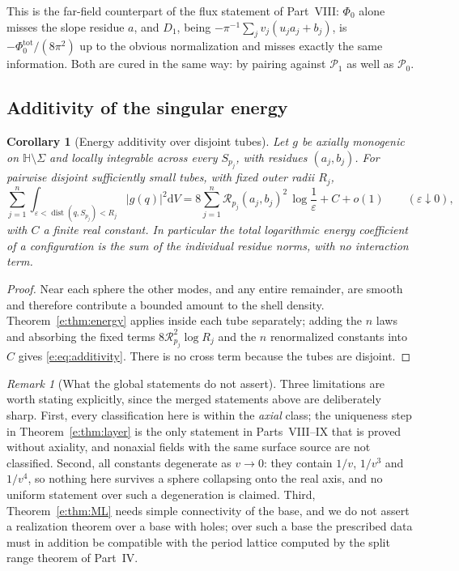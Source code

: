 \documentclass[11pt,a4paper]{article}
\numberwithin{equation}{section}
\newtheorem{corollary}[theorem]{Corollary}
\theoremstyle{definition}
\theoremstyle{remark}
\newtheorem{remark}[theorem]{Remark}
\theoremstyle{plain}
\newcommand{\HH}{\mathbb H}
\newcommand{\abs}[1]{\lvert #1\rvert}
\newcommand{\dd}{\mathrm d}
\begin{document}
This is the far-field counterpart of the flux statement of Part~VIII:
$\Phi_0$ alone misses the slope residue $a$, and $D_1$, being
$-\pi^{-1}\sum_jv_j(u_ja_j+b_j)$, is $-\Phi_0^{\mathrm{tot}}/(8\pi^2)$ up
to the obvious normalization and misses exactly the same information.
Both are cured in the same way: by pairing against $\mathcal P_1$ as well
as $\mathcal P_0$.

\subsection{Additivity of the singular energy}
\label{e:sec:additivity}

\begin{corollary}[Energy additivity over disjoint tubes]
\label{e:cor:additivity}
Let $g$ be axially monogenic on $\HH\setminus\Sigma$ and locally
integrable across every $S_{p_j}$, with residues $(a_j,b_j)$. For
pairwise disjoint sufficiently small tubes, with fixed outer radii
$R_j$,
\begin{equation}
 \sum_{j=1}^{n}\int_{\varepsilon<\operatorname{dist}(q,S_{p_j})<R_j}
        \abs{g(q)}^2\dd V
 =8\sum_{j=1}^{n}\mathcal R_{p_j}(a_j,b_j)^2\,\log\frac1\varepsilon
   +C+o(1)
 \qquad(\varepsilon\downarrow0),
 \label{e:eq:additivity}
\end{equation}
with $C$ a finite real constant. In particular the total logarithmic
energy coefficient of a configuration is the sum of the individual
residue norms, with no interaction term.
\end{corollary}

\begin{proof}
Near each sphere the other modes, and any entire remainder, are smooth
and therefore contribute a bounded amount to the shell density.
Theorem~\ref{e:thm:energy} applies inside each tube separately; adding
the $n$ laws and absorbing the fixed terms $8\mathcal
R_{p_j}^2\log R_j$ and the $n$ renormalized constants into $C$ gives
\eqref{e:eq:additivity}. There is no cross term because the tubes are
disjoint.
\end{proof}

\begin{remark}[What the global statements do not assert]
\label{e:rem:globalnotasserted}
Three limitations are worth stating explicitly, since the merged
statements above are deliberately sharp. First, every classification here
is within the \emph{axial} class; the uniqueness step in
Theorem~\ref{e:thm:layer} is the only statement in Parts~VIII--IX that is
proved without axiality, and nonaxial fields with the same surface source
are not classified. Second, all constants degenerate as $v\to0$: they
contain $1/v$, $1/v^3$ and $1/v^4$, so nothing here survives a sphere
collapsing onto the real axis, and no uniform statement over such a
degeneration is claimed. Third, Theorem~\ref{e:thm:ML} needs simple
connectivity of the base, and we do not assert a realization theorem over
a base with holes; over such a base the prescribed data must in addition
be compatible with the period lattice computed by the split range theorem
of Part~IV.
\end{remark}
\end{document}
